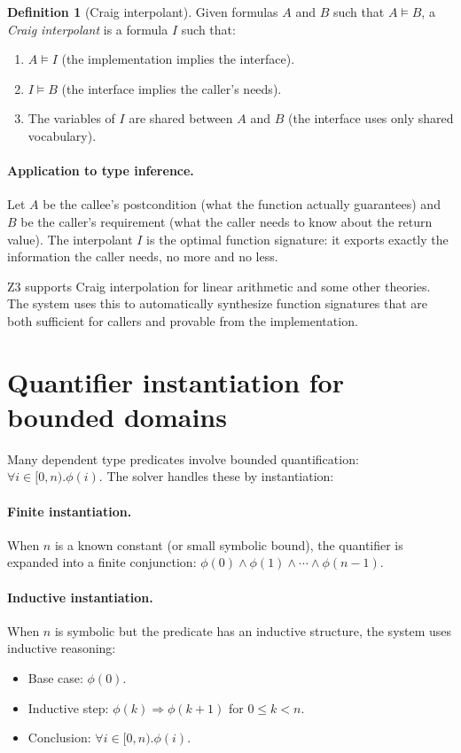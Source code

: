 \documentclass[11pt]{report}
\theoremstyle{definition}
\newtheorem{definition}{Definition}[section]
\theoremstyle{plain}
\begin{document}
\begin{definition}[Craig interpolant]
Given formulas $A$ and $B$ such that $A \models B$, a \emph{Craig
interpolant} is a formula $I$ such that:
\begin{enumerate}[nosep]
  \item $A \models I$ (the implementation implies the interface).
  \item $I \models B$ (the interface implies the caller's needs).
  \item The variables of $I$ are shared between $A$ and $B$ (the interface
        uses only shared vocabulary).
\end{enumerate}
\end{definition}

\paragraph{Application to type inference.}
Let $A$ be the callee's postcondition (what the function actually
guarantees) and $B$ be the caller's requirement (what the caller needs to
know about the return value). The interpolant $I$ is the optimal function
signature: it exports exactly the information the caller needs, no more and
no less.

Z3 supports Craig interpolation for linear arithmetic and some other
theories. The system uses this to automatically synthesize function
signatures that are both sufficient for callers and provable from the
implementation.

\section{Quantifier instantiation for bounded domains}

Many dependent type predicates involve bounded quantification:
$\forall i \in [0, n). \phi(i)$. The solver handles these by instantiation:

\paragraph{Finite instantiation.}
When $n$ is a known constant (or small symbolic bound), the quantifier is
expanded into a finite conjunction:
$\phi(0) \wedge \phi(1) \wedge \cdots \wedge \phi(n-1)$.

\paragraph{Inductive instantiation.}
When $n$ is symbolic but the predicate has an inductive structure, the
system uses inductive reasoning:
\begin{itemize}[nosep]
  \item Base case: $\phi(0)$.
  \item Inductive step: $\phi(k) \Rightarrow \phi(k+1)$ for $0 \leq k < n$.
  \item Conclusion: $\forall i \in [0, n). \phi(i)$.
\end{itemize}
\end{document}
